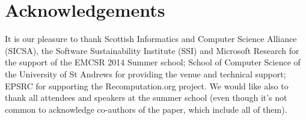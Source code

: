 \section*{Acknowledgements}
\label{s:ack}

It is our pleasure to thank Scottish Informatics and Computer Science Alliance (SICSA), 
the Software Sustainability Institute (SSI) and Microsoft Research for the support of the 
EMCSR 2014 Summer school; School of Computer Science of the University of St Andrews
for providing the venue and technical support; EPSRC for supporting the Recomputation.org
project. We would like also to thank all attendees and speakers at the summer school (even
though it's not common to acknowledge co-authors of the paper, which include all of them).

